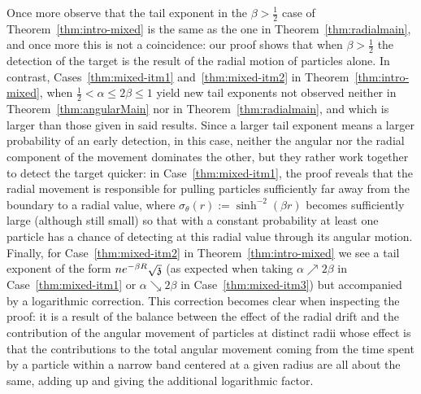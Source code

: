 Once more observe that the tail exponent in the $\beta>\frac12$ case of Theorem~\ref{thm:intro-mixed} is the same as the one in Theorem~\ref{thm:radialmain}, and once more this is not a coincidence: our proof shows that when $\beta>\frac{1}{2}$ the detection of the target is the result of the radial motion of particles alone.
In contrast, Cases~\eqref{thm:mixed-itm1} and~\eqref{thm:mixed-itm2} in Theorem~\ref{thm:intro-mixed}, when $\frac{1}{2}<\alpha\leq2\beta\leq1$ 
yield new tail exponents not observed neither in  Theorem~\ref{thm:angularMain} nor in Theorem~\ref{thm:radialmain}, and which is larger than those given in said results. Since a larger tail exponent means a larger probability of an early detection, in this case, neither the angular nor the radial component of the movement dominates the other, but they rather work together to detect the target quicker: in Case~\eqref{thm:mixed-itm1}, the proof reveals that the radial movement is responsible for pulling particles sufficiently far away from the boundary to a radial value, where $\sigma_{\theta}(r):=\sinh^{-2}(\beta r)$ becomes sufficiently large (although still small) so that with a constant probability at least one particle has a chance of detecting at this radial value through its angular motion. Finally, for Case~\eqref{thm:mixed-itm2}  in Theorem~\ref{thm:intro-mixed} we see a tail exponent of the form $ne^{-\beta R}\sqrt{\ss}$ (as expected when taking $\alpha\nearrow 2\beta$ in Case~\eqref{thm:mixed-itm1} or $\alpha\searrow 2\beta$ in Case~\eqref{thm:mixed-itm3}) but accompanied by a logarithmic correction.  This correction becomes clear when inspecting the proof: it is a result of the balance between the effect of the radial drift and the contribution of the angular movement of particles at distinct radii whose effect is that the contributions to the total angular movement coming from the time spent by a particle within a narrow band centered at a given radius are all about the same, adding up and giving the additional logarithmic factor.
 
